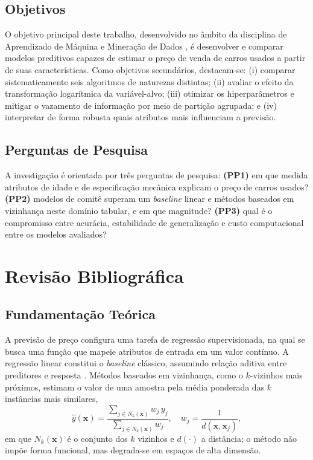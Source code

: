 \documentclass[conference]{IEEEtran}
\begin{document}
\subsection{Objetivos}
O objetivo principal deste trabalho, desenvolvido no âmbito da disciplina de Aprendizado de Máquina e Mineração de Dados \cite{pco213}, é desenvolver e comparar modelos preditivos capazes de estimar o preço de venda de carros usados a partir de suas características. Como objetivos secundários, destacam-se: (i) comparar sistematicamente seis algoritmos de naturezas distintas; (ii) avaliar o efeito da transformação logarítmica da variável-alvo; (iii) otimizar os hiperparâmetros e mitigar o vazamento de informação por meio de partição agrupada; e (iv) interpretar de forma robusta quais atributos mais influenciam a previsão.

\subsection{Perguntas de Pesquisa}
A investigação é orientada por três perguntas de pesquisa: \textbf{(PP1)} em que medida atributos de idade e de especificação mecânica explicam o preço de carros usados? \textbf{(PP2)} modelos de comitê superam um \textit{baseline} linear e métodos baseados em vizinhança neste domínio tabular, e em que magnitude? \textbf{(PP3)} qual é o compromisso entre acurácia, estabilidade de generalização e custo computacional entre os modelos avaliados?

\section{Revisão Bibliográfica}

\subsection{Fundamentação Teórica}
A previsão de preço configura uma tarefa de regressão supervisionada, na qual se busca uma função que mapeie atributos de entrada em um valor contínuo. A regressão linear constitui o \textit{baseline} clássico, assumindo relação aditiva entre preditores e resposta \cite{hastie}. Métodos baseados em vizinhança, como o $k$-vizinhos mais próximos, estimam o valor de uma amostra pela média ponderada das $k$ instâncias mais similares,
\begin{equation}
\hat{y}(\mathbf{x}) = \frac{\sum_{j \in N_k(\mathbf{x})} w_j\, y_j}{\sum_{j \in N_k(\mathbf{x})} w_j}, \quad w_j = \frac{1}{d(\mathbf{x}, \mathbf{x}_j)}, \label{eq:knn}
\end{equation}
em que $N_k(\mathbf{x})$ é o conjunto dos $k$ vizinhos e $d(\cdot)$ a distância; o método não impõe forma funcional, mas degrada-se em espaços de alta dimensão.
\end{document}
